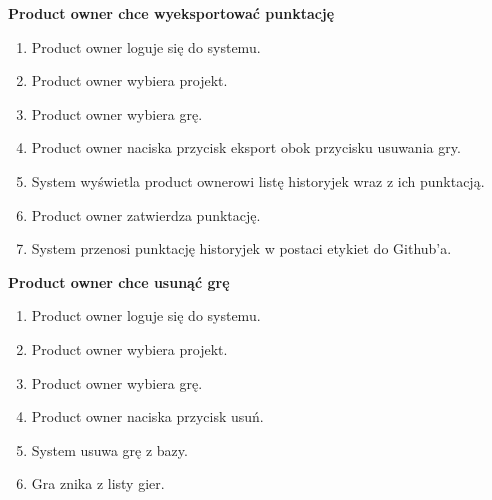 \textbf{Product owner chce wyeksportować punktację}
\begin{enumerate}
    \item Product owner loguje się do systemu.
    \item Product owner wybiera projekt.
    \item Product owner wybiera grę.
    \item Product owner naciska przycisk eksport obok przycisku usuwania gry.
    \item System wyświetla product ownerowi listę historyjek wraz z ich punktacją.
    \item Product owner zatwierdza punktację.
    \item System przenosi punktację historyjek w postaci etykiet do Github'a.
\end{enumerate}
\textbf{Product owner chce usunąć grę}
\begin{enumerate}
    \item Product owner loguje się do systemu.
    \item Product owner wybiera projekt.
    \item Product owner wybiera grę.
    \item Product owner naciska przycisk usuń.
    \item System usuwa grę z bazy.
    \item Gra znika z listy gier.
\end{enumerate}
